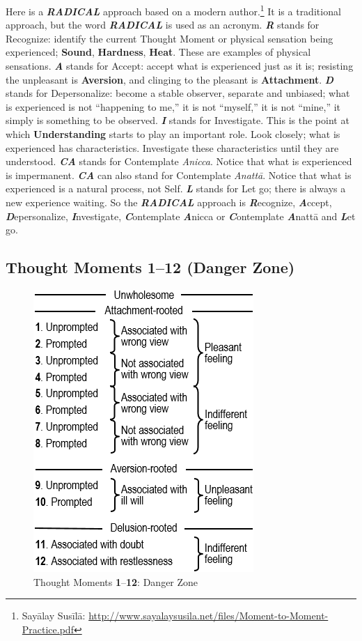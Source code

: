 Here is a \textbf{\textit{RADICAL}} approach based on a modern author.\footnote{Sayālay Susīlā: \url{http://www.sayalaysusila.net/files/Moment-to-Moment-Practice.pdf}} It is a traditional approach, but the word \textbf{\textit{RADICAL}} is used as an acronym. \textbf{\textit{R}} stands for Recognize: identify the current Thought Moment or physical sensation being experienced; \textbf{Sound}, \textbf{Hardness}, \textbf{Heat}. These are examples of physical sensations. \textbf{\textit{A}} stands for Accept: accept what is experienced just as it is; resisting the unpleasant is \textbf{Aversion}, and clinging to the pleasant is \textbf{Attachment}. \textbf{\textit{D}} stands for Depersonalize: become a stable observer, separate and unbiased; what is experienced is not “happening to me,” it is not “myself,” it is not “mine,” it simply is something to be observed. \textbf{\textit{I}} stands for Investigate. This is the point at which \textbf{Understanding} starts to play an important role. Look closely; what is experienced has characteristics. Investigate these characteristics until they are understood. \textbf{\textit{CA}} stands for Contemplate \textit{Anicca}. Notice that what is experienced is impermanent. \textbf{\textit{CA}} can also stand for Contemplate \textit{Anattā}. Notice that what is experienced is a natural process, not Self. \textbf{\textit{L}} stands for Let go; there is always a new experience waiting. So the \textbf{\textit{RADICAL}} approach is \textbf{\textit{R}}ecognize, \textbf{\textit{A}}ccept, \textbf{\textit{D}}epersonalize, \textbf{\textit{I}}nvestigate, \textbf{\textit{C}}ontemplate \textbf{\textit{A}}nicca or \textbf{\textit{C}}ontemplate \textbf{\textit{A}}nattā and \textbf{\textit{L}}et go.

\pagebreak

\subsection*{Thought Moments 1--12 (Danger Zone)}

\begin{figure}[h]
\centering
\includegraphics[width=0.45\linewidth]{./Diagrams/Danger}
\caption{Thought Moments \textbf{1}--\textbf{12}: Danger Zone}
\label{fig:Danger}
\end{figure}

